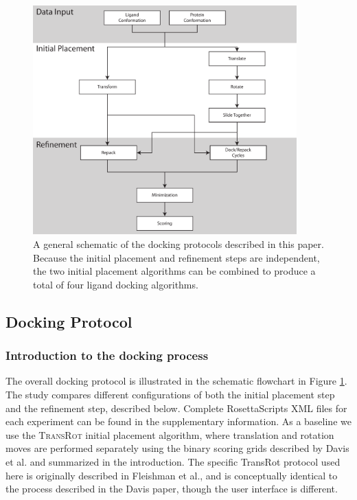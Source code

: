 \begin{figure}
\centering
\includegraphics[width=4in]{figures/lowres/protocol_flowchart.pdf}
\caption{
A general schematic of the docking protocols described in this paper.
Because the initial placement and refinement steps are independent, the two initial placement algorithms can be combined to produce a total of four ligand docking algorithms.  
}
\label{fig:docking_flowchart}
\end{figure}

\subsection{Docking Protocol}
\subsubsection{Introduction to the docking process}
The overall docking protocol is illustrated in the schematic flowchart in Figure \ref{fig:docking_flowchart}.
The study compares different configurations of both the initial placement step and the refinement step, described below.
Complete RosettaScripts XML files for each experiment can be found in the supplementary information.
As a baseline we use the \textsc{TransRot} initial placement algorithm, where translation and rotation moves are performed separately using the binary scoring grids described by Davis et al.\citep{Davis:2009bf} and summarized in the introduction.
The specific TransRot protocol used here is originally described in Fleishman et al.\citep{Fleishman:2011ji}, and is conceptually identical to the process described in the Davis paper, though the user interface is different. 

